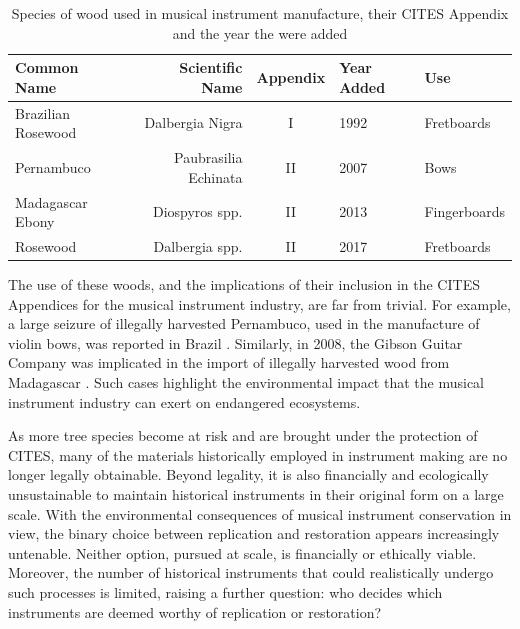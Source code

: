 \begin{table}
	\centering
	\small
	\begin{tabular}{lrcll}
		\toprule
		\textbf{Common Name} & \textbf{Scientific Name} & \textbf{Appendix} & \textbf{Year Added}            & \textbf{Use} \\ \hline
		Brazilian Rosewood   & Dalbergia Nigra          & I                 & 1992 \cite{cites_cop17_2017}   & Fretboards   \\
		Pernambuco           & Paubrasilia Echinata     & II                & 2007 \cite{cites_cop19_2019}   & Bows         \\
		Madagascar Ebony     & Diospyros spp.           & II                & 2013 \cite{cites_timber_2023} & Fingerboards \\
		Rosewood             & Dalbergia spp.           & II                & 2017 \cite{usda_species_2025}  & Fretboards   \\
		\bottomrule
	\end{tabular}
	\caption{Species of wood used in musical instrument manufacture, their CITES Appendix and the year the were added}
	\label{tab:cites}
\end{table}


The use of these woods, and the implications of their inclusion in the CITES
Appendices for the musical instrument industry, are far from trivial. For
example, a large seizure of illegally harvested Pernambuco, used in the
manufacture of violin bows, was reported in Brazil \cite{toledo_operation_2022}.
Similarly, in 2008, the Gibson Guitar Company was implicated in the import of
illegally harvested wood from Madagascar \cite{justice_gibson_2012}. Such cases
highlight the environmental impact that the musical instrument industry can
exert on endangered ecosystems.

As more tree species become at risk and are brought under the protection of
CITES, many of the materials historically employed in instrument making are no
longer legally obtainable. Beyond legality, it is also financially and
ecologically unsustainable to maintain historical instruments in their original
form on a large scale. With the environmental consequences of musical instrument
conservation in view, the binary choice between replication and restoration
appears increasingly untenable. Neither option, pursued at scale, is financially
or ethically viable. Moreover, the number of historical instruments that could
realistically undergo such processes is limited, raising a further question: who
decides which instruments are deemed worthy of replication or restoration?

